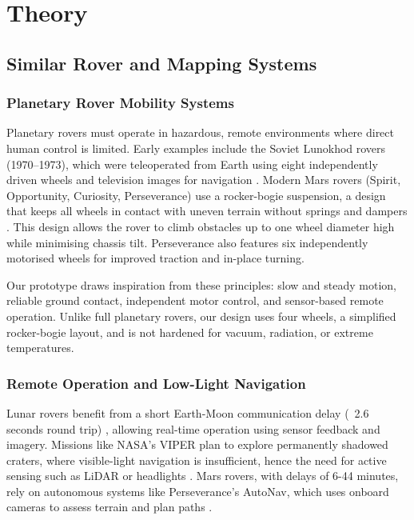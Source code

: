 \chapter{Theory}

\section{Similar Rover and Mapping Systems}
\subsection{Planetary Rover Mobility Systems}

Planetary rovers must operate in hazardous, remote environments where direct human control is limited. 
Early examples include the Soviet Lunokhod rovers (1970–1973), which were teleoperated from Earth using eight independently driven wheels and television images for navigation \cite{Lunokhod}.
Modern Mars rovers (Spirit, Opportunity, Curiosity, Perseverance) use a rocker-bogie suspension, a design that keeps all wheels in contact with uneven terrain without springs and dampers \cite{Mars2020Wheels}.
This design allows the rover to climb obstacles up to one wheel diameter high while minimising chassis tilt. 
Perseverance also features six independently motorised wheels for improved traction and in-place turning.

Our prototype draws inspiration from these principles: slow and steady motion, reliable ground contact, independent motor control, and sensor-based remote operation. Unlike full planetary rovers, our design uses four wheels, a simplified rocker-bogie layout, and is not hardened for vacuum, radiation, or extreme temperatures.

\subsection{Remote Operation and Low-Light Navigation}
Lunar rovers benefit from a short Earth-Moon communication delay (~2.6 seconds round trip) \cite{SpaceLatency}, allowing real-time operation using sensor feedback and imagery. 
Missions like NASA's VIPER plan to explore permanently shadowed craters, where visible-light navigation is insufficient, hence the need for active sensing such as LiDAR or headlights \cite{VIPER}.
 Mars rovers, with delays of 6-44 minutes, rely on autonomous systems like Perseverance's AutoNav, 
which uses onboard cameras to assess terrain and plan paths \cite{SpaceLatency,PerseveranceAutoNav}.


